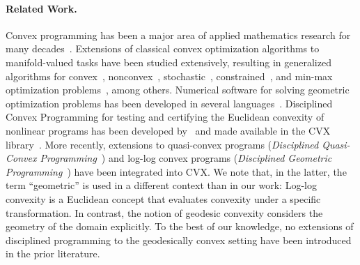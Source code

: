 \documentclass[twoside,11pt]{article}
\begin{document}
\paragraph{Related Work.}
Convex programming has been a major area of applied mathematics research for many decades~\citep{Boyd_Vandenberghe_2004}. Extensions of classical convex optimization algorithms to manifold-valued tasks have been studied extensively, resulting in generalized algorithms for convex~\citep{udriste1994convex,bacak2014convex,zhang2016first}, nonconvex~\citep{boumal2019global}, stochastic~\citep{bonnabel2013stochastic,zhang2016riemannian,weber2021projection}, constrained~\citep{weber2022riemannian,weber2021projection,bergmann2019intrinsic,bergmann2022first}, and min-max optimization problems~\citep{martinez2023accelerated,jordan2022first}, among others.
Numerical software for solving geometric optimization problems has been developed in several languages~\citep{manopt,pymanopt,manoptjl,roptlib}. Disciplined Convex Programming for testing and certifying the Euclidean convexity of nonlinear programs has been developed by~\citet{grant2006disciplined} and made available in the CVX library~\citep{diamond2016cvxpy}. More recently, extensions to quasi-convex programs (\emph{Disciplined Quasi-Convex Programming}~\citep{dqp}) and log-log convex programs (\emph{Disciplined Geometric Programming}~\citep{dgp}) have been integrated into CVX. We note that, in the latter, the term ``geometric'' is used in a different context than in our work: Log-log convexity is a Euclidean concept that evaluates convexity under a specific transformation. In contrast, the notion of geodesic convexity considers the geometry of the domain explicitly. To the best of our knowledge, no extensions of disciplined programming to the geodesically convex setting have been introduced in the prior literature.

\newpage
\end{document}
